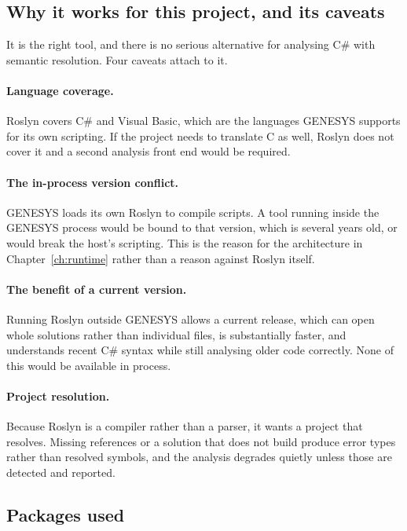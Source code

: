 \subsection{Why it works for this project, and its caveats}

It is the right tool, and there is no serious alternative for analysing C\# with
semantic resolution. Four caveats attach to it.

\paragraph{Language coverage.}
Roslyn covers C\# and Visual Basic, which are the languages GENESYS supports for
its own scripting. If the project needs to translate C as well, Roslyn does not cover it 
and a second analysis front end would be required.

\paragraph{The in-process version conflict.}
GENESYS loads its own Roslyn to compile scripts. A tool running inside the
GENESYS process would be bound to that version, which is several years old, or
would break the host's scripting. This is the reason for the architecture in
Chapter~\ref{ch:runtime} rather than a reason against Roslyn itself.

\paragraph{The benefit of a current version.}
Running Roslyn outside GENESYS allows a current release, which can open whole
solutions rather than individual files, is substantially faster, and understands
recent C\# syntax while still analysing older code correctly. None of this would
be available in process.

\paragraph{Project resolution.}
Because Roslyn is a compiler rather than a parser, it wants a project that
resolves. Missing references or a solution that does not build produce error
types rather than resolved symbols, and the analysis degrades quietly unless
those are detected and reported.

\subsection{Packages used}

